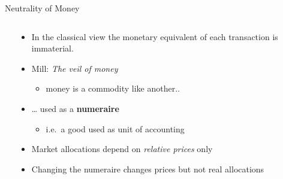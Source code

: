 \begin{frame}{Neutrality of Money}
\begin{columns}[T]
\begin{column}{0.48\textwidth}
\begin{overprint}
\end{overprint}
\end{column}

\begin{column}{0.48\textwidth}
\begin{itemize}
\tightlist
\item
  In the classical view the monetary equivalent of each transaction is
  immaterial.
\item
  Mill: \emph{The veil of money}

  \begin{itemize}
  \tightlist
  \item
    money is a commodity like another..
  \end{itemize}
\item
  \ldots{} used as a \textbf{numeraire}

  \begin{itemize}
  \tightlist
  \item
    i.e.~a good used as unit of accounting
  \end{itemize}
\item
  Market allocations depend on \emph{relative prices} only
\end{itemize}

\pause

\begin{itemize}
\tightlist
\item
  Changing the numeraire changes prices but not real allocations
\end{itemize}
\end{column}
\end{columns}
\end{frame}

